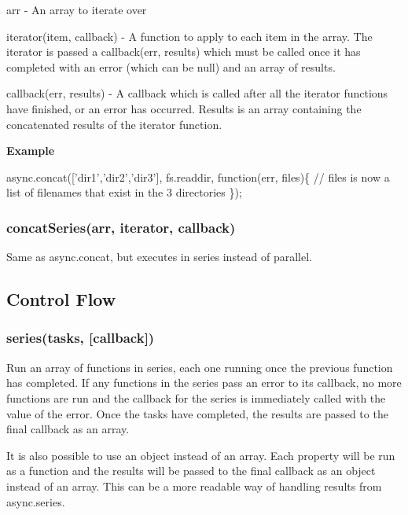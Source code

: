 \begin{DoxyItemize}
\item arr -\/ An array to iterate over
\item iterator(item, callback) -\/ A function to apply to each item in the array. The iterator is passed a callback(err, results) which must be called once it has completed with an error (which can be null) and an array of results.
\item callback(err, results) -\/ A callback which is called after all the iterator functions have finished, or an error has occurred. Results is an array containing the concatenated results of the iterator function.
\end{DoxyItemize}

{\bfseries Example}


\begin{DoxyCode}
async.concat([\textcolor{stringliteral}{'dir1'},\textcolor{stringliteral}{'dir2'},\textcolor{stringliteral}{'dir3'}], fs.readdir, \textcolor{keyword}{function}(err, files)\{
    \textcolor{comment}{// files is now a list of filenames that exist in the 3 directories}
\});
\end{DoxyCode}
 



\label{_concatSeries}%
 \subsubsection*{concat\+Series(arr, iterator, callback)}

Same as async.\+concat, but executes in series instead of parallel.

\subsection*{Control Flow}

\label{_series}%
 \subsubsection*{series(tasks, \mbox{[}callback\mbox{]})}

Run an array of functions in series, each one running once the previous function has completed. If any functions in the series pass an error to its callback, no more functions are run and the callback for the series is immediately called with the value of the error. Once the tasks have completed, the results are passed to the final callback as an array.

It is also possible to use an object instead of an array. Each property will be run as a function and the results will be passed to the final callback as an object instead of an array. This can be a more readable way of handling results from async.\+series.

